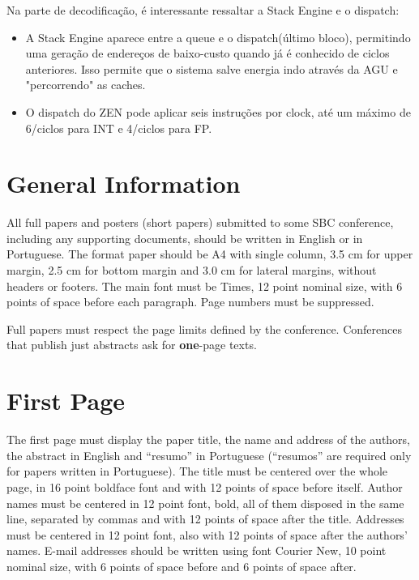 \documentclass[12pt]{article}
\begin{document}
Na parte de decodificação, é interessante ressaltar a Stack Engine e o dispatch:
\begin{itemize}
	\item A Stack Engine aparece entre a queue e o dispatch(último bloco), permitindo uma geração de endereços de baixo-custo quando já é conhecido de ciclos anteriores. Isso permite que o sistema salve energia indo através da AGU e "percorrendo" as caches.
	\item O dispatch do ZEN pode aplicar seis instruções por clock, até um máximo de 6/ciclos para INT e 4/ciclos para FP.
\end{itemize}

\newpage

\section{General Information}

All full papers and posters (short papers) submitted to some SBC conference,
including any supporting documents, should be written in English or in
Portuguese. The format paper should be A4 with single column, 3.5 cm for upper
margin, 2.5 cm for bottom margin and 3.0 cm for lateral margins, without
headers or footers. The main font must be Times, 12 point nominal size, with 6
points of space before each paragraph. Page numbers must be suppressed.

Full papers must respect the page limits defined by the conference.
Conferences that publish just abstracts ask for \textbf{one}-page texts.

\newpage

\section{First Page} \label{sec:firstpage}

The first page must display the paper title, the name and address of the
authors, the abstract in English and ``resumo'' in Portuguese (``resumos'' are
required only for papers written in Portuguese). The title must be centered
over the whole page, in 16 point boldface font and with 12 points of space
before itself. Author names must be centered in 12 point font, bold, all of
them disposed in the same line, separated by commas and with 12 points of
space after the title. Addresses must be centered in 12 point font, also with
12 points of space after the authors' names. E-mail addresses should be
written using font Courier New, 10 point nominal size, with 6 points of space
before and 6 points of space after.
\end{document}
